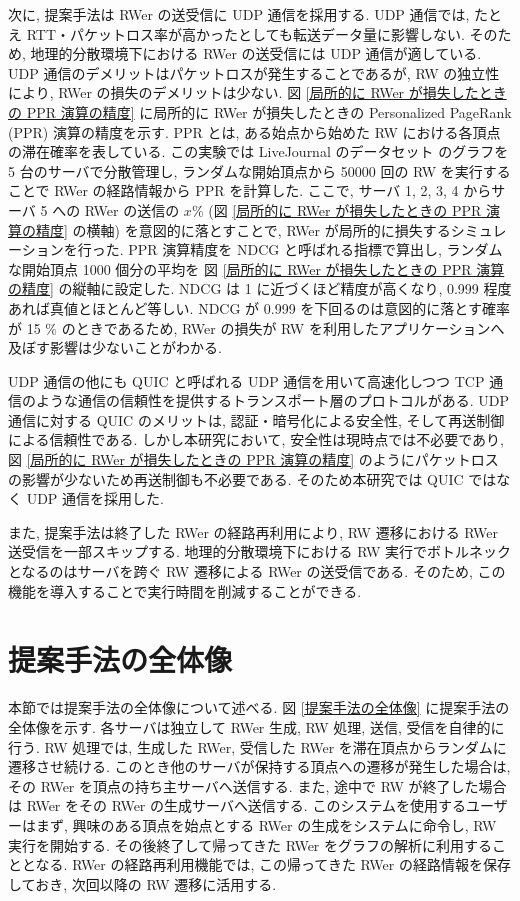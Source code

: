 次に, 提案手法は RWer の送受信に UDP 通信を採用する. UDP 通信では, たとえ RTT・パケットロス率が高かったとしても転送データ量に影響しない. そのため, 地理的分散環境下における RWer の送受信には UDP 通信が適している. UDP 通信のデメリットはパケットロスが発生することであるが, RW の独立性により, RWer の損失のデメリットは少ない. 図 \ref{局所的に RWer が損失したときの PPR 演算の精度} に局所的に RWer が損失したときの Personalized PageRank (PPR) 演算の精度を示す. PPR とは, ある始点から始めた RW における各頂点の滞在確率を表している. この実験では LiveJournal のデータセット\cite{snapnets} のグラフを 5 台のサーバで分散管理し, ランダムな開始頂点から 50000 回の RW を実行することで RWer の経路情報から PPR を計算した. ここで, サーバ 1, 2, 3, 4 からサーバ 5 への RWer の送信の $x\%$ (図 \ref{局所的に RWer が損失したときの PPR 演算の精度} の横軸) を意図的に落とすことで, RWer が局所的に損失するシミュレーションを行った. PPR 演算精度を NDCG と呼ばれる指標で算出し, ランダムな開始頂点 1000 個分の平均を 図 \ref{局所的に RWer が損失したときの PPR 演算の精度} の縦軸に設定した. NDCG は 1 に近づくほど精度が高くなり, 0.999 程度あれば真値とほとんど等しい. NDCG が 0.999 を下回るのは意図的に落とす確率が 15 $\%$ のときであるため, RWer の損失が RW を利用したアプリケーションへ及ぼす影響は少ないことがわかる. 

UDP 通信の他にも QUIC と呼ばれる UDP 通信を用いて高速化しつつ TCP 通信のような通信の信頼性を提供するトランスポート層のプロトコルがある. UDP 通信に対する QUIC のメリットは, 認証・暗号化による安全性, そして再送制御による信頼性である. しかし本研究において, 安全性は現時点では不必要であり, 図 \ref{局所的に RWer が損失したときの PPR 演算の精度} のようにパケットロスの影響が少ないため再送制御も不必要である. そのため本研究では QUIC ではなく UDP 通信を採用した. 

また, 提案手法は終了した RWer の経路再利用により, RW 遷移における RWer 送受信を一部スキップする. 地理的分散環境下における RW 実行でボトルネックとなるのはサーバを跨ぐ RW 遷移による RWer の送受信である. そのため, この機能を導入することで実行時間を削減することができる. 

\section{提案手法の全体像}\label{提案手法の全体像について}

本節では提案手法の全体像について述べる. 図 \ref{提案手法の全体像} に提案手法の全体像を示す. 各サーバは独立して RWer 生成, RW 処理, 送信, 受信を自律的に行う. RW 処理では, 生成した RWer, 受信した RWer を滞在頂点からランダムに遷移させ続ける. このとき他のサーバが保持する頂点への遷移が発生した場合は, その RWer を頂点の持ち主サーバへ送信する. また, 途中で RW が終了した場合は RWer をその RWer の生成サーバへ送信する. このシステムを使用するユーザーはまず, 興味のある頂点を始点とする RWer の生成をシステムに命令し, RW 実行を開始する. その後終了して帰ってきた RWer をグラフの解析に利用することとなる. RWer の経路再利用機能では, この帰ってきた RWer の経路情報を保存しておき, 次回以降の RW 遷移に活用する. 

